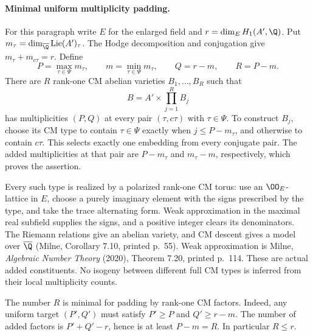 \paragraph{Minimal uniform multiplicity padding.}
For this paragraph write $E$ for the enlarged field and
$r=\dim_E H_1(A',\Q)$.  Put
$m_\tau=\dim_{\overline\Q}\operatorname{Lie}(A')_\tau$.
The Hodge decomposition and conjugation give
$m_\tau+m_{c\tau}=r$.  Define
\[
 P=\max_{\tau\in\Psi}m_\tau,\qquad
 m=\min_{\tau\in\Psi}m_\tau,\qquad
 Q=r-m,\qquad R=P-m.
 \tag{A11g}
\]
There are $R$ rank-one CM abelian varieties $B_1,\ldots,B_R$
such that
\[
        B=A'\times\prod_{j=1}^R B_j
 \tag{A11h}
\]
has multiplicities $(P,Q)$ at every pair $(\tau,c\tau)$ with
$\tau\in\Psi$.  To construct $B_j$, choose its CM type to
contain $\tau\in\Psi$ exactly when $j\leq P-m_\tau$, and
otherwise to contain $c\tau$.  This selects exactly one
embedding from every conjugate pair.  The added multiplicities
at that pair are $P-m_\tau$ and $m_\tau-m$, respectively,
which proves the assertion.

Every such type is realized by a polarized rank-one CM torus:
use an $\OO_E$-lattice in $E$, choose a purely imaginary
element with the signs prescribed by the type, and take the
trace alternating form.  Weak approximation in the maximal
real subfield supplies the signs, and a positive integer clears
its denominators.  The Riemann relations give an abelian
variety, and CM descent gives a model over $\overline\Q$
(Milne, Corollary 7.10, printed p.~55).  Weak approximation is
Milne, \emph{Algebraic Number Theory} (2020), Theorem 7.20,
printed p.~114.  These are actual added constituents.  No
isogeny between different full CM types is inferred from their
local multiplicity counts.

The number $R$ is minimal for padding by rank-one CM factors.
Indeed, any uniform target $(P',Q')$ must satisfy
$P'\geq P$ and $Q'\geq r-m$.  The number of added factors is
$P'+Q'-r$, hence is at least $P-m=R$.  In particular $R\leq r$.

